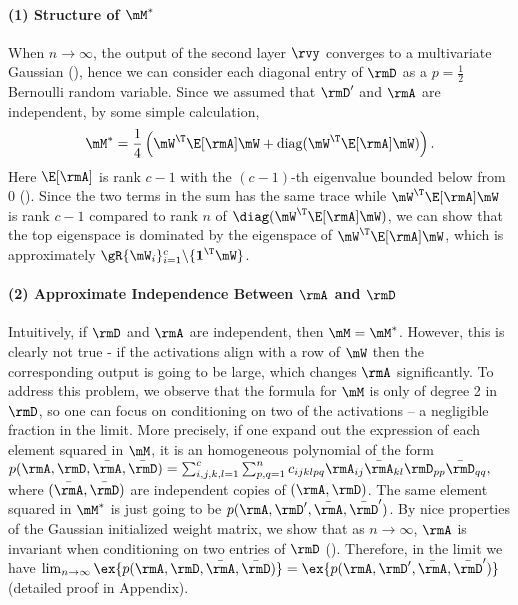 \paragraph{(1) Structure of $\mM^*$} When $n\to\infty$, the output of the second layer $\rvy$ converges to a multivariate Gaussian (), hence we can consider each diagonal entry of $\rmD$ as a $p=\frac12$ Bernoulli random variable. Since we assumed that $\rmD'$ and $\rmA$ are independent, by some simple calculation,
\begin{equation}
    \mM^*=\frac14\left(\mW^\T\E[\rmA]\mW+\text{diag}(\mW^\T\E[\rmA]\mW)\right).
\end{equation}
Here $\E[\rmA]$ is rank $c-1$ with the $(c-1)$-th eigenvalue bounded below from 0 ().
Since the two terms in the sum has the same trace while $\mW^\T\E[\rmA]\mW$ is rank $c-1$ compared to rank $n$ of $\diag(\mW^\T\E[\rmA]\mW)$, we can show that the top eigenspace is dominated by the eigenspace of $\mW^\T\E[\rmA]\mW$, which is approximately $\gR\{\mW_i\}_{i=1}^c\backslash\{\textbf{1}^\T\mW\}$. 

\paragraph{(2) Approximate Independence Between $\rmA$ and $\rmD$} Intuitively, if $\rmD$ and $\rmA$ are independent, then $\mM = \mM^*$. However, this is clearly not true - if the activations align with a row of $\mW$ then the corresponding output is going to be large, which changes $\rmA$ significantly. To address this problem, we observe that the formula for $\mM$ is only of degree 2 in $\rmD$, so one can focus on conditioning on two of the activations \--- a negligible fraction in the limit. More precisely, if one expand out the expression of each element squared in $\mM$, it is an homogeneous polynomial of the form
$p(\rmA,\rmD,\bar\rmA,\bar\rmD) = \sum_{i,j,k,l=1}^c\sum_{p,q=1}^n c_{ijklpq}\rmA_{ij}\bar\rmA_{kl}\rmD_{pp}\bar\rmD_{qq},
$
where $(\bar\rmA,\bar\rmD)$ are independent copies of $(\rmA, \rmD)$. The same element squared in $\mM^*$ is just going to be $p(\rmA,\rmD',\bar\rmA,\bar\rmD')$.
By nice properties of the Gaussian initialized weight matrix, we show that as $n\to\infty$, $\rmA$ is invariant when conditioning on two entries of $\rmD$ (). Therefore, in the limit we have $\lim_{n\to\infty}\ex{p(\rmA, \rmD, \bar\rmA, \bar\rmD)} = \ex{p(\rmA, \rmD', \bar\rmA, \bar\rmD')}$ (detailed proof in Appendix). 


